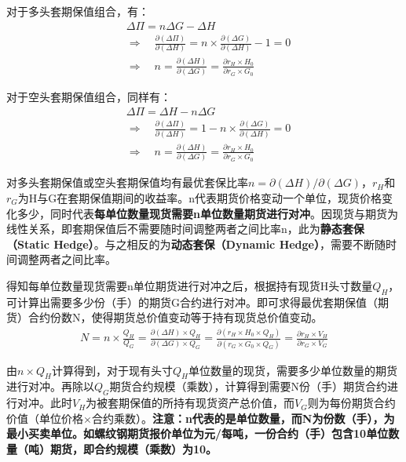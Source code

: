 \documentclass[11pt]{article}
\begin{document}
对于多头套期保值组合，有：
\begin{align*}
    &\Delta \Pi = n\Delta G - \Delta H \\
    &\Rightarrow\quad\frac{\partial (\Delta \Pi)}{\partial (\Delta H)}  = n\times \frac{\partial (\Delta G)}{\partial (\Delta H)} - 1 = 0 \\ 
    &\Rightarrow \quad n = \frac{\partial(\Delta H)}{\partial(\Delta G)} = \frac{\partial r_H \times H_0}{\partial r_G \times G_0} 
\end{align*}

对于空头套期保值组合，同样有：
\begin{align*}
    &\Delta \Pi = \Delta H - n \Delta G \\
    &\Rightarrow\quad\frac{\partial (\Delta \Pi)}{\partial (\Delta H)}  =  1 - n\times \frac{\partial (\Delta G)}{\partial (\Delta H)} = 0 \\ 
    &\Rightarrow \quad n = \frac{\partial(\Delta H)}{\partial(\Delta G)} = \frac{\partial r_H \times H_0}{\partial r_G \times G_0} 
\end{align*}

对多头套期保值或空头套期保值均有最优套保比率$n=\partial(\Delta H)/\partial(\Delta G)$，$r_H$和$r_G$为H与G在套期保值期间的收益率。n代表期货价格变动一个单位，现货价格变化多少，同时代表\textbf{每单位数量现货需要n单位数量期货进行对冲}。因现货与期货为线性关系，即套期保值后不需要随时间调整两者之间比率n，此为\textbf{静态套保（Static Hedge）}。与之相反的为\textbf{动态套保（Dynamic Hedge）}，需要不断随时间调整两者之间比率。

得知每单位数量现货需要n单位期货进行对冲之后，根据持有现货H头寸数量$Q_H$，可计算出需要多少份（手）的期货G合约进行对冲。即可求得最优套期保值（期货）合约份数N，使得期货总价值变动等于持有现货总价值变动。
\begin{align*}
    N = n \times \frac{Q_H}{Q_G} = \frac{\partial(\Delta H)\times Q_H}{\partial(\Delta G)\times Q_G} = \frac{\partial(r_H \times H_0 \times Q_H)}{\partial(r_G \times G_0 \times Q_G)} = \frac{\partial r_H \times V_H}{\partial r_G \times V_G}
\end{align*}

由$n \times Q_H$计算得到，对于现有头寸$Q_H$单位数量的现货，需要多少单位数量的期货进行对冲。再除以$Q_G$期货合约规模（乘数），计算得到需要N份（手）期货合约进行对冲。此时$V_H$为被套期保值的所持有现货资产总价值，而$V_G$则为每份期货合约价值（单位价格$\times$合约乘数）。\textbf{注意：n代表的是单位数量，而N为份数（手），为最小买卖单位。如螺纹钢期货报价单位为元/每吨，一份合约（手）包含10单位数量（吨）期货，即合约规模（乘数）为10。}
\end{document}
